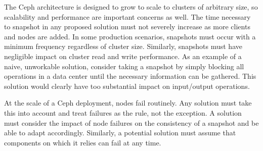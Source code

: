The Ceph architecture is designed to grow to scale to clusters of
arbitrary size, so scalability and performance are important concerns
as well. The time necessary to snapshot in any proposed solution must
not severely increase as more clients and nodes are added. In some
production scenarios, snapshots must occur with a minimum frequency
regardless of cluster size. Similarly, snapshots must have negligible
impact on cluster read and write performance. As an example of 
a naive, unworkable solution, consider taking a snapshot by 
simply blocking all operations in a data center until the necessary
information can be gathered. This solution would clearly have too
substantial impact on input/output
operations.

At the scale of a Ceph deployment, nodes fail routinely. Any
solution must take this into account and treat failures as the rule,
not the exception. A solution must consider the impact of node
failures on the consistency of a snapshot and be able to adapt
accordingly. Similarly, a potential solution must assume that
components on which it relies can fail at any time.
